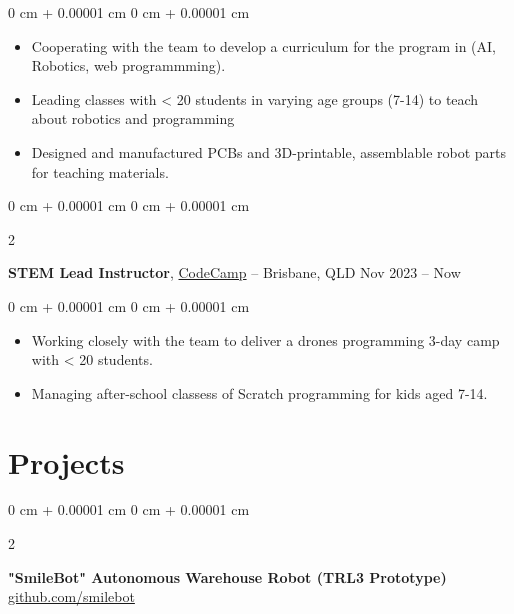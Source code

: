 \documentclass[10pt, letterpaper]{article}
\newenvironment{highlights}{
    \begin{itemize}[
        topsep=0.10 cm,
        parsep=0.10 cm,
        partopsep=0pt,
        itemsep=0pt,
        leftmargin=0 cm + 10pt
    ]
}{
    \end{itemize}
} %
\newenvironment{onecolentry}{
    \begin{adjustwidth}{
        0 cm + 0.00001 cm
    }{
        0 cm + 0.00001 cm
    }
}{
    \end{adjustwidth}
} %
\newenvironment{twocolentry}[2][]{
    \onecolentry
    \def\secondColumn{#2}
    \setcolumnwidth{\fill, 4.5 cm}
    \begin{paracol}{2}
}{
    \switchcolumn \raggedleft \secondColumn
    \end{paracol}
    \endonecolentry
} %
\begin{document}
\vspace{0.10 cm}
\begin{onecolentry}
      \begin{highlights}
            \item Cooperating with the team to develop a curriculum for the program in (AI,
            Robotics, web programmming).
            \item Leading classes with < 20 students in varying age groups (7-14) to teach
            about robotics and programming
            \item Designed and manufactured PCBs and 3D-printable, assemblable robot parts for
            teaching materials.
      \end{highlights}
\end{onecolentry}

\vspace{0.4 cm}

\begin{twocolentry}{
            Nov 2023 – Now
      }
      \textbf{STEM Lead Instructor}, \href{https://www.codecamp.com.au/}{CodeCamp} -- Brisbane, QLD\end{twocolentry}

\vspace{0.10 cm}
\begin{onecolentry}
      \begin{highlights}
            \item Working closely with the team to deliver a drones programming 3-day camp with < 20 students.
            \item Managing after-school classess of Scratch programming for kids aged 7-14.

      \end{highlights}
\end{onecolentry}

\section{Projects}

\begin{twocolentry}{
            \href{https://github.com/bocho0600/smilebot}{github.com/smilebot}
      }
      \textbf{"SmileBot" Autonomous Warehouse Robot (TRL3 Prototype)}\end{twocolentry}
\end{document}
